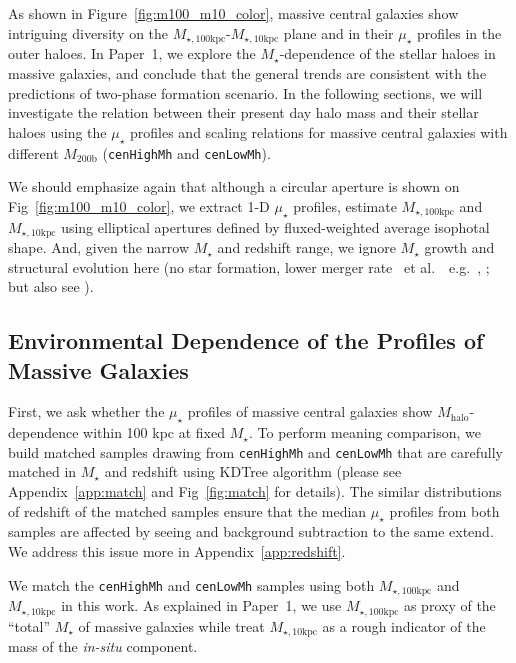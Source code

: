 \documentclass[a4paper,fleqn,usenatbib]{mnras}
\def\etal{{\ et al.~}}
\def\rbcg{\texttt{cenHighMh}}
\def\nbcg{\texttt{cenLowMh}}
\def\mstar{{$M_{\star}$}}
\def\mhalo{{$M_{\mathrm{halo}}$}}
\def\minn{{$M_{\star,10\mathrm{kpc}}$}}
\def\mtot{{$M_{\star,100\mathrm{kpc}}$}}
\def\mden{{$\mu_{\star}$}}
\begin{document}
    As shown in Figure~\ref{fig:m100_m10_color}, massive central galaxies show 
    intriguing diversity on the \mtot{}-\minn{} plane and in their \mden{} profiles 
    in the outer haloes.  
    In Paper~1, we explore the \mstar{}-dependence of the stellar haloes in massive 
    galaxies, and conclude that the general trends are consistent with the 
    predictions of two-phase formation scenario. 
    In the following sections, we will investigate the relation between their 
    present day halo mass and their stellar haloes using the \mden{} profiles and 
    scaling relations for massive central galaxies with different $M_{\mathrm{200b}}$ 
    (\rbcg{} and \nbcg{}).
    
    We should emphasize again that although a circular aperture is shown on 
    Fig~\ref{fig:m100_m10_color}, we extract 1-D \mden{} profiles, estimate 
    \mtot{} and \minn{} using elliptical apertures defined by fluxed-weighted average 
    isophotal shape. 
    And, given the narrow \mstar{} and redshift range, we ignore \mstar{} growth 
    and structural evolution here
    (no star formation, lower merger rate \etal~e.g.\ \citealt{Bellstedt2016},
    \citealt{Inagaki2015}; but also see \citealt{Bai2014}). 

\subsection{Environmental Dependence of the Profiles of Massive Galaxies}
    \label{ssec:sbp_mtot} 
       
    First, we ask whether the \mden{} profiles of massive central galaxies show 
    \mhalo{}-dependence within 100 kpc at fixed \mstar{}. 
    To perform meaning comparison, we build matched samples drawing from \rbcg{} and 
    \nbcg{} that are carefully matched in \mstar{} and redshift using KDTree algorithm 
    (please see Appendix~\ref{app:match} and Fig~\ref{fig:match} for details). 
    The similar distributions of redshift of the matched samples ensure that the 
    median \mden{} profiles from both samples are affected by seeing and background 
    subtraction to the same extend. 
    We address this issue more in Appendix~\ref{app:redshift}. 
    
    We match the \rbcg{} and \nbcg{} samples using both \mtot{} and \minn{} in this
    work. 
    As explained in Paper~1, we use \mtot{} as proxy of the ``total'' \mstar{}
    of massive galaxies while treat \minn{} as a rough indicator of the mass of the 
    \textit{in-situ} component. 
    
\end{document}
